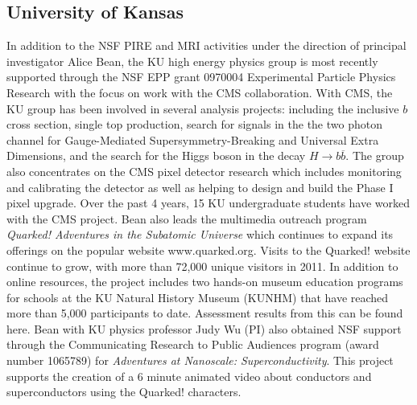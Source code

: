 
\subsection{University of Kansas}

In addition to the NSF PIRE and MRI activities under the direction of
principal investigator Alice Bean, the KU high energy physics group is
most recently supported through the NSF EPP grant 0970004
Experimental Particle Physics Research with the focus on work with the
CMS collaboration.  With CMS, the KU group has been involved in
several analysis projects: including the inclusive $b$ cross
section\cite{bcross}, single top production\cite{singletop}, search
for signals in the the two photon channel for Gauge-Mediated
Supersymmetry-Breaking and Universal Extra Dimensions\cite{dmsearch},
and the search for the Higgs boson in the decay $H\rightarrow
b\overline{b}$\cite{higgsbb}.  The group also concentrates on the
CMS pixel detector research which includes monitoring and calibrating
the detector as well as helping to design and build the Phase I pixel
upgrade.  Over the past 4 years, 15 KU undergraduate students have
worked with the CMS project.  Bean also leads the multimedia outreach
program {\it Quarked!  Adventures in the Subatomic Universe} which
continues to expand its offerings on the popular website
www.quarked.org.  Visits to the Quarked! website continue to grow,
with more than 72,000 unique visitors in 2011. In addition to online
resources, the project includes two hands-on museum education programs
for schools at the KU Natural History Museum (KUNHM) that have reached
more than 5,000 participants to date.  Assessment results from this
can be found here\cite{quarked}.  Bean with KU physics professor Judy
Wu (PI) also obtained NSF support through the Communicating Research
to Public Audiences program (award number 1065789) for {\it Adventures
  at Nanoscale: Superconductivity}. This project supports the creation
of a 6 minute animated video about conductors and superconductors
using the Quarked! characters.



